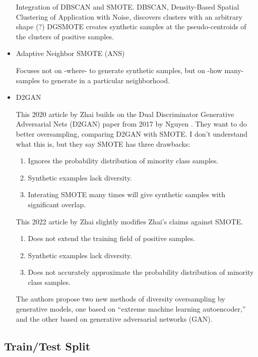 \begin{itemize}
			Integration of DBSCAN and SMOTE.   DBSCAN, Density-Based Spatial Clustering of Application with Noise, discovers clusters with an arbitrary shape (?)  DGSMOTE creates synthetic samples at the pseudo-centroids of the clusters of positive samples.  
			
			\item Adaptive Neighbor SMOTE (ANS)
			\cite{MAHMUDAH_2021}

			Focuses not on -where- to generate synthetic samples, but on -how many- samples to generate in a particular neighborhood. 

			\item D2GAN 

This 2020 article by Zhai \cite{ZHAI_2020_D2GAN} builds on the Dual Discriminator Generative Adversarial Nets (D2GAN) paper from 2017 by Nguyen \cite{NGUYEN_2017}.  They want to do better oversampling, comparing D2GAN with SMOTE.  I don't understand what this is, but they say SMOTE has three drawbacks:

\begin{enumerate}
	\item Ignores the probability distribution of minority class samples.
	\item Synthetic examples lack diversity.
	\item Interating SMOTE many times will give synthetic samples with significant overlap.
\end{enumerate}

This 2022 article by Zhai \cite{ZHAI_2022} slightly modifies Zhai's claims against SMOTE.

\begin{enumerate}
	\item Does not extend the training field of positive samples.
	\item Synthetic examples lack diversity.
	\item Does not accurately approximate the probability distribution of minority class samples.
\end{enumerate}

The authors propose two new methods of diversity oversampling by generative models, one based on ``extreme machine learning autoencoder,'' and the other based on generative adversarial networks (GAN).  

			
		\end{itemize}
		

\subsection{Train/Test Split}

